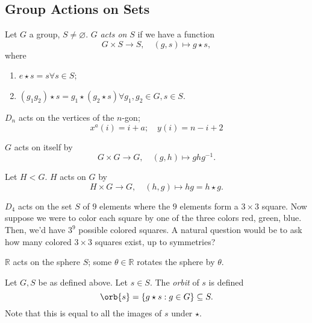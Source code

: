 \documentclass[12pt,oneside]{article}
\begin{document}
\subsection{Group Actions on Sets}

\begin{definition}
  Let $G$ a group, $S \neq \varnothing$. $G$ \emph{acts on} $S$ if we have a function \[
    G \times S \to S, \quad (g,s) \mapsto g \star s,  
  \]
  where \begin{enumerate}
    \item $e \star s = s \forall s \in S$;
    \item $(g_1 g_2) \star s = g_1 \star (g_2\star s) \forall g_1, g_2 \in G, s \in S$.
  \end{enumerate}
\end{definition}

\begin{example}\label{ex:groupactions1}
  $D_n$ acts on the vertices of the $n$-gon; \[
  x^{a}(i) = i + a; \quad y(i) = n - i + 2  
  \]
\end{example}
\begin{example}[Conjugation]\label{ex:groupactions2}
  $G$ acts on itself by \[
  G \times G \to G, \quad (g,h) \mapsto ghg^{-1}.  
  \]
\end{example}

\begin{example}\label{ex:groupactions3}
  Let $H < G$. $H$ acts on $G$ by \[
  H \times G \to G, \quad (h, g) \mapsto hg = h \star g.
  \]
\end{example}

\begin{example}\label{ex:groupactions4}
  $D_4$ acts on the set $S$ of $9$ elements where the $9$ elements form a $3\times 3$ square. Now suppose we were to color each square by one of the three colors red, green, blue. Then, we'd have $3^9$ possible colored squares. A natural question would be to ask how many colored $3\times 3$ squares exist, up to symmetries?
\end{example}

\begin{example}\label{ex:groupactions5}
  $\mathbb{R}$ acts on the sphere $S$; some $\theta \in \mathbb{R}$ rotates the sphere by $\theta$.
\end{example}

\begin{definition}[Orbit]
  Let $G, S$ be as defined above. Let $s \in S$. The \emph{orbit} of $s$ is defined \[
  \orb{s} = \{g \star s : g \in G\} \subseteq S.
    \]
    Note that this is equal to all the images of $s$ under $\star$.
\end{definition}
\end{document}
